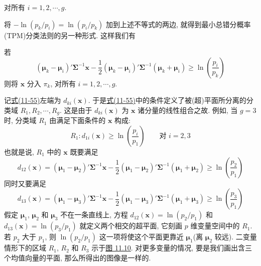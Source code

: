 
对所有 $i=1,2,\cdots,g$.

将 $-\ln(p_k/p_i)=\ln(p_i/p_k)$ 加到上述不等式的两边, 就得到最小总错分概率(TPM)分类法则的另一种形式. 这样我们有

若
\label{eq:11-55}
\begin{equation}
(\boldsymbol{\mu}_k-\boldsymbol{\mu}_i)'\boldsymbol{\Sigma}^{-1}\mathbf{x}-\frac{1}{2}(\boldsymbol{\mu}_k-\boldsymbol{\mu}_i)'\boldsymbol{\Sigma}^{-1}(\boldsymbol{\mu}_k+\boldsymbol{\mu}_i)\ge\ln\left(\frac{p_i}{p_k}\right)
\tag{11-55}
\end{equation}
则将 $\mathbf{x}$ 分入 $\pi_k$, 对所有 $i=1,2,\cdots,g$.

记\hyperref[eq:11-55]{式(11-55)}左端为 $d_{ki}(\mathbf{x})$. 于是\hyperref[eq:11-55]{式(11-55)}中的条件定义了被(超)平面所分离的分类域 $R_1,R_2,\cdots,R_g$. 这是由于 $d_{ki}(\mathbf{x})$ 为 $\mathbf{x}$ 诸分量的线性组合之故. 例如, 当 $g=3$ 时, 分类域 $R_1$ 由满足下面条件的 $\mathbf{x}$ 构成:
\[
R_1: d_{1i}(\mathbf{x})\ge\ln\left(\frac{p_i}{p_1}\right)\qquad \text{对 } i=2,3
\]
也就是说, $R_1$ 中的 $\mathbf{x}$ 既要满足
\[
d_{12}(\mathbf{x})=(\boldsymbol{\mu}_1-\boldsymbol{\mu}_2)'\boldsymbol{\Sigma}^{-1}\mathbf{x}-\frac{1}{2}(\boldsymbol{\mu}_1-\boldsymbol{\mu}_2)'\boldsymbol{\Sigma}^{-1}(\boldsymbol{\mu}_1+\boldsymbol{\mu}_2)\ge\ln\left(\frac{p_2}{p_1}\right)
\]
同时又要满足
\[
d_{13}(\mathbf{x})=(\boldsymbol{\mu}_1-\boldsymbol{\mu}_3)'\boldsymbol{\Sigma}^{-1}\mathbf{x}-\frac{1}{2}(\boldsymbol{\mu}_1-\boldsymbol{\mu}_3)'\boldsymbol{\Sigma}^{-1}(\boldsymbol{\mu}_1+\boldsymbol{\mu}_3)\ge\ln\left(\frac{p_3}{p_1}\right)
\]
假定 $\boldsymbol{\mu}_1$, $\boldsymbol{\mu}_2$ 和 $\boldsymbol{\mu}_3$ 不在一条直线上, 方程 $d_{12}(\mathbf{x})=\ln(p_2/p_1)$ 和 $d_{13}(\mathbf{x})=\ln(p_3/p_1)$ 就定义两个相交的超平面, 它刻画 $p$ 维变量空间中的 $R_1$. 若 $p_2$ 大于 $p_1$, 则 $\ln(p_2/p_1)$ 这一项将使这个平面更靠近 $\boldsymbol{\mu}_1$(离 $\boldsymbol{\mu}_2$ 较远). 二变量情形下的区域 $R_1$, $R_2$ 和 $R_3$ 示于\hyperref[fig:11.10]{图 11.10}. 对更多变量的情况, 要是我们画出含三个均值向量的平面, 那么所得出的图像是一样的.

